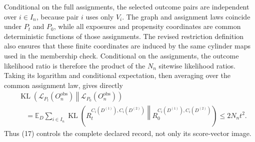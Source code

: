 Conditional on the full assignments, the selected outcome pairs are independent over \(i\in I_n\), because pair \(i\) uses only \(V_i\).  The graph and assignment laws coincide under \(P_t\) and \(P_0\), while all exposures and propensity coordinates are common deterministic functions of those assignments.  The revised restriction definition also ensures that these finite coordinates are induced by the same cylinder maps used in the membership check.  Conditional on the assignments, the outcome likelihood ratio is therefore the product of the \(N_n\) sitewise likelihood ratios.  Taking its logarithm and conditional expectation, then averaging over the common assignment law, gives directly
\[
 \begin{aligned}
 &\operatorname{KL}\!\left(
   \mathcal L_{P_t}(O_n^{\mathrm{obs}})
   \middle\Vert
   \mathcal L_{P_0}(O_n^{\mathrm{obs}})
  \right)\\
 &\quad=
 \mathbb E_D\sum_{i\in I_n}
 \operatorname{KL}\!\left(
  R_t^{C_i(D^{(1)}),C_i(D^{(2)})}
  \middle\Vert
  R_0^{C_i(D^{(1)}),C_i(D^{(2)})}
 \right)
 \le2N_nt^2.
 \end{aligned} \tag{17}
\]
Thus (17) controls the complete declared record, not only its score-vector image.

